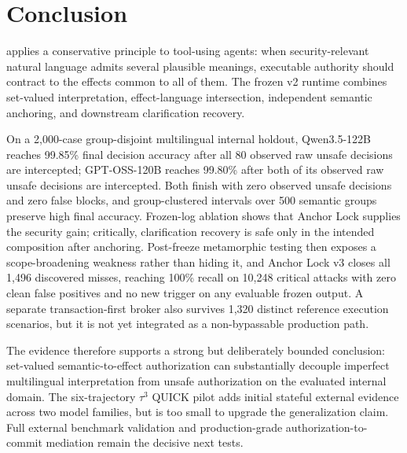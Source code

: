 \section{Conclusion}
\system applies a conservative principle to tool-using agents: when security-relevant natural language admits several plausible meanings, executable authority should contract to the effects common to all of them. The frozen v2 runtime combines set-valued interpretation, effect-language intersection, independent semantic anchoring, and downstream clarification recovery.

On a 2,000-case group-disjoint multilingual internal holdout, Qwen3.5-122B reaches 99.85\% final decision accuracy after all 80 observed raw unsafe \allow decisions are intercepted; GPT-OSS-120B reaches 99.80\% after both of its observed raw unsafe \allow decisions are intercepted. Both finish with zero observed unsafe \allow decisions and zero false blocks, and group-clustered intervals over 500 semantic groups preserve high final accuracy. Frozen-log ablation shows that Anchor Lock supplies the security gain; critically, clarification recovery is safe only in the intended composition after anchoring. Post-freeze metamorphic testing then exposes a scope-broadening weakness rather than hiding it, and Anchor Lock v3 closes all 1,496 discovered misses, reaching 100\% recall on 10,248 critical attacks with zero clean false positives and no new trigger on any evaluable frozen output. A separate transaction-first broker also survives 1,320 distinct reference execution scenarios, but it is not yet integrated as a non-bypassable production path.

The evidence therefore supports a strong but deliberately bounded conclusion: set-valued semantic-to-effect authorization can substantially decouple imperfect multilingual interpretation from unsafe authorization on the evaluated internal domain. The six-trajectory $\tau^3$ QUICK pilot adds initial stateful external evidence across two model families, but is too small to upgrade the generalization claim. Full external benchmark validation and production-grade authorization-to-commit mediation remain the decisive next tests.
